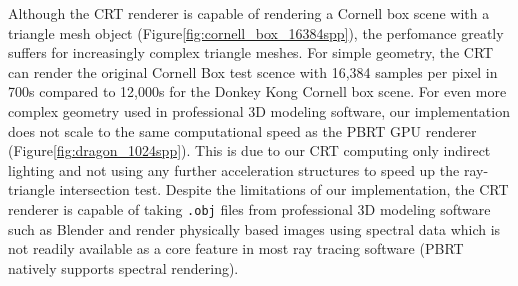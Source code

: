 \documentclass[../main.tex]{subfiles}
\begin{document}
Although the CRT renderer is capable of rendering a Cornell box scene with a
triangle mesh object (Figure\ref{fig:cornell_box_16384spp}), the perfomance greatly suffers for increasingly complex
triangle meshes. For simple geometry, the CRT can render the original Cornell Box
test scence with 16,384 samples per pixel in 700s compared to 12,000s for the
Donkey Kong Cornell box scene. For even more complex geometry used in professional
3D modeling software, our implementation does not scale to the same computational
speed as the PBRT GPU renderer (Figure\ref{fig:dragon_1024spp}). This is due to our CRT computing
only indirect lighting and not using any further acceleration structures to speed up the
ray-triangle intersection test. Despite the limitations of our implementation, the CRT
renderer is capable of taking \texttt{.obj} files from professional 3D modeling software
such as Blender and render physically based images using spectral data which is not readily
available as a core feature in most ray tracing software (PBRT natively supports spectral
rendering).

\ifSubfilesClassLoaded{%
    \nocite{*}
    \twocolumn
}{}
\end{document}
